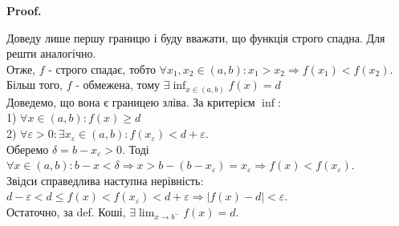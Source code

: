 \documentclass[a4paper, 14pt]{article}
\makeatletter
\def\huge{\displaystyle}
\def\qed{$\blacksquare$}
\theoremstyle{theoremdd}
\theoremstyle{theoremdd}
\theoremstyle{theoremdd}
\theoremstyle{theoremdd}
\theoremstyle{theoremdd}
\theoremstyle{theoremdd}
\theoremstyle{theoremdd}
\theoremstyle{theoremdd}
\renewenvironment{proof}[1][Proof.\\]{\par
\pushQED{\hfill \qed}%
\normalfont \topsep6\p@\@plus6\p@\relax
\trivlist
\item\relax
{\bfseries
#1\@addpunct{.}}\hspace\labelsep\ignorespaces
}{%
\popQED\endtrivlist\@endpefalse
}
\makeatother
\begin{document}
\begin{proof}
Доведу лише першу границю і буду вважати, що функція строго спадна. Для решти аналогічно.
\bigskip \\
Отже, $f$ - строго спадає, тобто $\forall x_1,x_2 \in (a,b): x_1>x_2 \Rightarrow f(x_1)<f(x_2)$.\\
Більш того, $f$ - обмежена, тому $\exists \huge \inf_{x \in (a,b)} f(x) = d$\\
Доведемо, що вона є границею зліва. За критерієм $\inf$:\\
1) $\forall x \in (a,b): f(x) \geq d$\\
2) $\forall \varepsilon > 0: \exists x_{\varepsilon} \in (a,b): f(x_{\varepsilon})< d + \varepsilon$.\\
Оберемо $\delta = b - x_{\varepsilon} > 0$. Тоді $\forall x \in (a,b): b-x<\delta \Rightarrow x > b - (b-x_{\varepsilon}) = x_{\varepsilon} \Rightarrow f(x) < f(x_\varepsilon)$.\\
Звідси справедлива наступна нерівність:\\
$d - \varepsilon < d \leq f(x) < f(x_\varepsilon) < d + \varepsilon \Rightarrow |f(x)-d| < \varepsilon$.\\
Остаточно, за def. Коші, $\exists \huge \lim_{x \to b^-} f(x) =  d$.
\end{proof}
\end{document}
